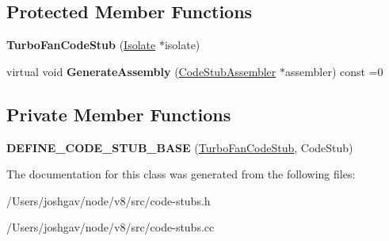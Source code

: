 \subsection*{Protected Member Functions}
\begin{DoxyCompactItemize}
\item 
{\bfseries Turbo\+Fan\+Code\+Stub} (\hyperlink{classv8_1_1internal_1_1_isolate}{Isolate} $\ast$isolate)\hypertarget{classv8_1_1internal_1_1_turbo_fan_code_stub_a441bd0ef59a27a4bdff18f0aca6282ac}{}\label{classv8_1_1internal_1_1_turbo_fan_code_stub_a441bd0ef59a27a4bdff18f0aca6282ac}

\item 
virtual void {\bfseries Generate\+Assembly} (\hyperlink{classv8_1_1internal_1_1_code_stub_assembler}{Code\+Stub\+Assembler} $\ast$assembler) const  =0\hypertarget{classv8_1_1internal_1_1_turbo_fan_code_stub_a27993551802ac61bdc4b6d8ab6531125}{}\label{classv8_1_1internal_1_1_turbo_fan_code_stub_a27993551802ac61bdc4b6d8ab6531125}

\end{DoxyCompactItemize}
\subsection*{Private Member Functions}
\begin{DoxyCompactItemize}
\item 
{\bfseries D\+E\+F\+I\+N\+E\+\_\+\+C\+O\+D\+E\+\_\+\+S\+T\+U\+B\+\_\+\+B\+A\+SE} (\hyperlink{classv8_1_1internal_1_1_turbo_fan_code_stub}{Turbo\+Fan\+Code\+Stub}, Code\+Stub)\hypertarget{classv8_1_1internal_1_1_turbo_fan_code_stub_a1048a963cf0bfc5e33c7755af2ae214c}{}\label{classv8_1_1internal_1_1_turbo_fan_code_stub_a1048a963cf0bfc5e33c7755af2ae214c}

\end{DoxyCompactItemize}


The documentation for this class was generated from the following files\+:\begin{DoxyCompactItemize}
\item 
/\+Users/joshgav/node/v8/src/code-\/stubs.\+h\item 
/\+Users/joshgav/node/v8/src/code-\/stubs.\+cc\end{DoxyCompactItemize}
